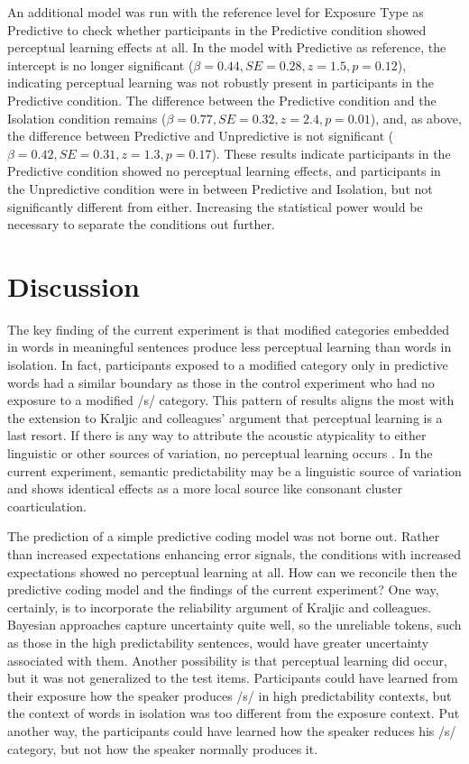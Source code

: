 An additional model was run with the reference level for Exposure Type as Predictive to check whether participants in the Predictive condition showed perceptual learning effects at all.
In the model with Predictive as reference, the intercept is no longer significant ($\beta = 0.44, SE = 0.28, z = 1.5, p = 0.12$), indicating perceptual learning was not robustly present in participants in the Predictive condition.  
The difference between the Predictive condition and the Isolation condition remains ($\beta = 0.77, SE = 0.32, z = 2.4, p = 0.01$), and, as above, the difference between Predictive and Unpredictive is not significant ($\beta = 0.42, SE = 0.31, z = 1.3, p = 0.17$).
These results indicate participants in the Predictive condition showed no perceptual learning effects, and participants in the Unpredictive condition were in between Predictive and Isolation, but not significantly different from either.  
Increasing the statistical power would be necessary to separate the conditions out further.


\section{Discussion}

The key finding of the current experiment is that modified categories embedded in words in meaningful sentences produce less perceptual learning than words in isolation.  
In fact, participants exposed to a modified category only in predictive words had a similar boundary as those in the control experiment who had no exposure to a modified /s/ category.
This pattern of results aligns the most with the extension to Kraljic and colleagues' argument that perceptual learning is a last resort.
If there is any way to attribute the acoustic atypicality to either linguistic or other sources of variation, no perceptual learning occurs \citep{Kraljic2008,Kraljic2008a}.
In the current experiment, semantic predictability may be a linguistic source of variation and shows identical effects as a more local source like consonant cluster coarticulation.

The prediction of a simple predictive coding model \citep{Clark2013} was not borne out.
Rather than increased expectations enhancing error signals, the conditions with increased expectations showed no perceptual learning at all.
How can we reconcile then the predictive coding model and the findings of the current experiment?
One way, certainly, is to incorporate the reliability argument of Kraljic and colleagues.
Bayesian approaches capture uncertainty quite well, so the unreliable tokens, such as those in the high predictability sentences, would have greater uncertainty associated with them.
Another possibility is that perceptual learning did occur, but it was not generalized to the test items.
Participants could have learned from their exposure how the speaker produces /s/ in high predictability contexts, but the context of words in isolation was too different from the exposure context.
Put another way, the participants could have learned how the speaker reduces his /s/ category, but not how the speaker normally produces it.

